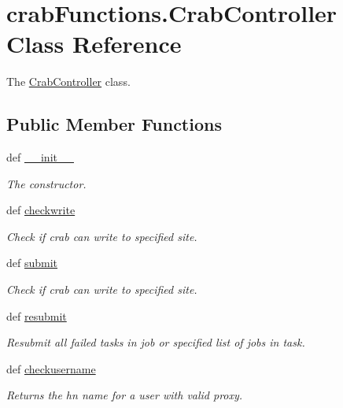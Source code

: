 \section{crab\-Functions.\-Crab\-Controller Class Reference}
\label{classcrabFunctions_1_1CrabController}


The \hyperlink{classcrabFunctions_1_1CrabController}{Crab\-Controller} class.  


\subsection*{Public Member Functions}
\begin{DoxyCompactItemize}
\item 
def \hyperlink{classcrabFunctions_1_1CrabController_ab954e7c5fcfb41ceab85bc598f06a3d4}{\-\_\-\-\_\-init\-\_\-\-\_\-}
\begin{DoxyCompactList}\small\item\em The constructor. \end{DoxyCompactList}\item 
def \hyperlink{classcrabFunctions_1_1CrabController_a0e58fa81e3b2972951be87809c38d539}{checkwrite}
\begin{DoxyCompactList}\small\item\em Check if crab can write to specified site. \end{DoxyCompactList}\item 
def \hyperlink{classcrabFunctions_1_1CrabController_a287a67fc99629f8e0d4fb94325cdf099}{submit}
\begin{DoxyCompactList}\small\item\em Check if crab can write to specified site. \end{DoxyCompactList}\item 
def \hyperlink{classcrabFunctions_1_1CrabController_ad38efc8e97d1b90e31b797fa6bcf47e5}{resubmit}
\begin{DoxyCompactList}\small\item\em Resubmit all failed tasks in job or specified list of jobs in task. \end{DoxyCompactList}\item 
def \hyperlink{classcrabFunctions_1_1CrabController_a9a400a21d825adac4edf8a6b47945cda}{checkusername}
\begin{DoxyCompactList}\small\item\em Returns the hn name for a user with valid proxy. \end{DoxyCompactList}\item 

\end{DoxyCompactItemize}
